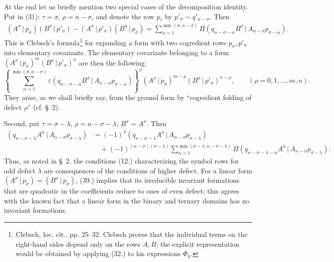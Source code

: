 \documentclass[11pt]{article}
\newcommand{\pair}[2]{(#1\,|\,#2)}
\newcommand{\eps}{\varepsilon}
\begin{document}
At the end let us briefly mention two special cases of the decomposition identity. Put in (31): $\tau=\sigma$, $\rho=n-\sigma$, and denote the row $p_\tau$ by $p'_\sigma\sim q'_{n-\sigma}$. Then
\begin{equation}
\begin{aligned}
\pair{A^\sigma}{p_\sigma}\pair{B^\sigma}{p'_\sigma}
-\pair{A^\sigma}{p'_\sigma}\pair{B^\sigma}{p_\sigma}
=\sum_{\alpha=1}^{\min(\sigma,n-\sigma)}
\Pi\pair{q_{n-\sigma-\alpha}B^\sigma}{A_{n-\sigma}p_{\sigma-\alpha}}.
\end{aligned}
\tag{37}
\end{equation}
This is Clebsch's formula\footnote{Clebsch, loc. cit., pp. 25--32. Clebsch proves that the individual terms on the right-hand sides depend only on the rows $A,B$; the explicit representation would be obtained by applying (32.) to his expressions $\Phi_h$.} for expanding a form with two cogredient rows $p_\sigma,p'_\sigma$ into elementary covariants. The elementary covariants belonging to a form $\pair{A^\sigma}{p_\sigma}^m\pair{B^\sigma}{p'_\sigma}^n$ are then the following:
\begin{equation}
 \left\{\sum_{\alpha=1}^{\min(\sigma,n-\sigma)}
 \eps\pair{q_{n-\sigma-\alpha}B^\sigma}{A_{n-\sigma}p_{\sigma-\alpha}}
 \right\}^{\rho}
 \pair{A^\sigma}{p_\sigma}^{m-\rho}\pair{B^\sigma}{p'_\sigma}^{n-\rho},
 \qquad (\rho=0,1,\ldots,m,n).
\tag{38}
\end{equation}
They arise, as we shall briefly say, from the ground form by ``cogredient folding of defect $\rho$'' (cf. \S\ 2).

Second, put $\tau=\sigma-\lambda$, $\rho=n-\sigma-\lambda$, $B^\sigma=A^\sigma$. Then
\begin{equation}
\begin{aligned}
\pair{q_{n-\sigma-\lambda}A^\sigma}{A_{n-\sigma}p_{\sigma-\lambda}}
&=(-1)^\lambda\pair{q_{n-\sigma-\lambda}A^\sigma}{A_{n-\sigma}p_{\sigma-\lambda}}\\
&\quad+(-1)^{(n-\sigma)(\sigma-\lambda)}
 \sum_{\alpha=1}^{\min(\sigma-\lambda,n-\sigma-\lambda)}
 \Pi\pair{q_{n-\sigma-\lambda-\alpha}A^\sigma}{A_{n-\sigma}p_{\sigma-\lambda}}.
\end{aligned}
\tag{39}
\end{equation}
Thus, as noted in \S\ 2, the conditions (12.) characterizing the symbol rows for odd defect $\lambda$ are consequences of the conditions of higher defect. For a linear form $\pair{A^\sigma}{p_\sigma}=\pair{B^\sigma}{p_\sigma}$, (39.) implies that its irreducible invariant formations that are quadratic in the coefficients reduce to ones of even defect; this agrees with the known fact that a linear form in the binary and ternary domains has no invariant formations.
\end{document}
